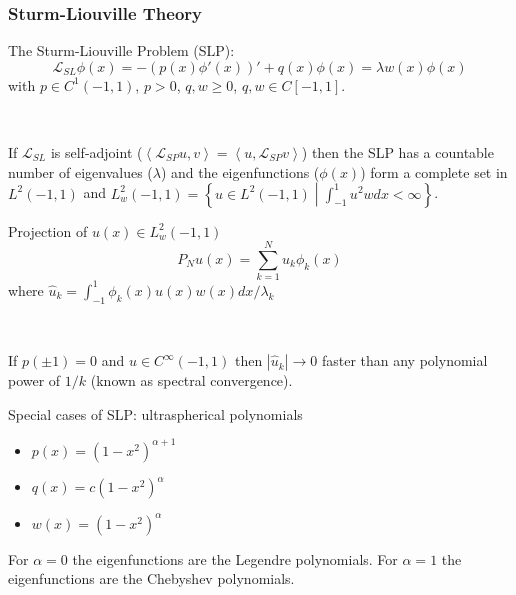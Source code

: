 \documentclass{beamer}
\newcommand{\abs}[1]{\left \vert #1 \right \vert}
\newcommand{\Set}[2]{\left \{ #1 \middle \vert #2 \right \}}
\newcommand{\inner}[2]{\left \langle #1, #2 \right \rangle}
\begin{document}
\begin{frame}

\frametitle{Sturm-Liouville Theory}

The Sturm-Liouville Problem (SLP):
\begin{equation*}
\mathcal{L}_{SL} \phi(x) = -\left ( p(x) \phi'(x) \right )' + q(x) \phi(x) = \lambda w(x) \phi(x)
\end{equation*}
with $p \in C^1(-1,1)$, $p>0$, $q, w \geq 0$, $q, w \in C[-1,1]$.

~

If $\mathcal{L}_{SL}$ is self-adjoint ($\inner{\mathcal{L}_{SP}u}{v} = \inner{u}{\mathcal{L}_{SP}v}$) then the SLP has a countable number of eigenvalues ($\lambda$) and the eigenfunctions ($\phi(x)$) form a complete set in $L^2(-1,1)$ and $L_w^2(-1,1) = \Set{u \in L^2(-1,1)}{\int_{-1}^1 u^2 w dx < \infty}$.
\end{frame}

\begin{frame}

\begin{block}{Projection of $u(x) \in L_w^2(-1,1)$}
\begin{equation*}
P_N u(x) = \sum_{k=1}^N \hat{u}_k \phi_k(x)
\end{equation*}
where $\hat{u}_k = \int_{-1}^1 \phi_k(x) u(x) w(x) dx / \lambda_k$
\end{block}

~

If $p(\pm 1) = 0$ and $u \in C^\infty(-1,1)$ then $\abs{\hat{u}_k} \to 0$ faster than any polynomial power of $1/k$ (known as spectral convergence).

\end{frame}

\begin{frame}

Special cases of SLP: ultraspherical polynomials
\begin{itemize}
\item $p(x) = (1-x^2)^{\alpha+1}$
\item $q(x) =c(1-x^2)^\alpha$
\item $w(x) = (1-x^2)^\alpha$
\end{itemize}
For $\alpha = 0$ the eigenfunctions are the Legendre polynomials.
For $\alpha = 1$ the eigenfunctions are the Chebyshev polynomials.

\end{frame}
\end{document}
